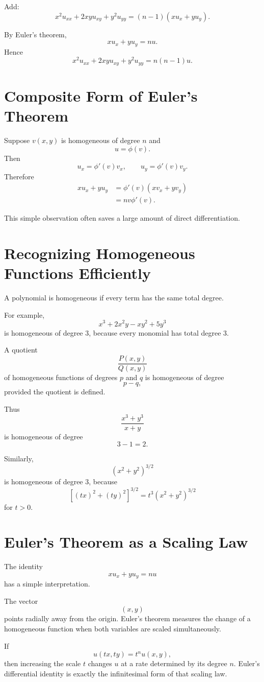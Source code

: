 \documentclass[11pt,oneside]{book}
\theoremstyle{studentthm}
\theoremstyle{definition}
\begin{document}
Add:
\[
x^2u_{xx}
+
2xyu_{xy}
+
y^2u_{yy}
=
(n-1)(xu_x+yu_y).
\]

By Euler's theorem,
\[
xu_x+yu_y=nu.
\]
Hence
\[
x^2u_{xx}
+
2xyu_{xy}
+
y^2u_{yy}
=
n(n-1)u.
\]

\section{Composite Form of Euler's Theorem}

Suppose \(v(x,y)\) is homogeneous of degree \(n\) and
\[
u=\phi(v).
\]
Then
\[
u_x=\phi'(v)v_x,
\qquad
u_y=\phi'(v)v_y.
\]
Therefore
\[
\begin{aligned}
xu_x+yu_y
&=
\phi'(v)(xv_x+yv_y)\\
&=
nv\phi'(v).
\end{aligned}
\]

This simple observation often saves a large amount of direct
differentiation.


\section{Recognizing Homogeneous Functions Efficiently}

A polynomial is homogeneous if every term has the same total degree.

For example,
\[
x^3+2x^2y-xy^2+5y^3
\]
is homogeneous of degree \(3\), because every monomial has total degree
\(3\).

A quotient
\[
\frac{P(x,y)}{Q(x,y)}
\]
of homogeneous functions of degrees \(p\) and \(q\) is homogeneous of
degree
\[
p-q,
\]
provided the quotient is defined.

Thus
\[
\frac{x^3+y^3}{x+y}
\]
is homogeneous of degree
\[
3-1=2.
\]

Similarly,
\[
(x^2+y^2)^{3/2}
\]
is homogeneous of degree \(3\), because
\[
[(tx)^2+(ty)^2]^{3/2}
=
t^3(x^2+y^2)^{3/2}
\]
for \(t>0\).

\section{Euler's Theorem as a Scaling Law}

The identity
\[
xu_x+yu_y=nu
\]
has a simple interpretation.

The vector
\[
(x,y)
\]
points radially away from the origin. Euler's theorem measures the
change of a homogeneous function when both variables are scaled
simultaneously.

If
\[
u(tx,ty)=t^nu(x,y),
\]
then increasing the scale \(t\) changes \(u\) at a rate determined by
its degree \(n\). Euler's differential identity is exactly the
infinitesimal form of that scaling law.
\end{document}
